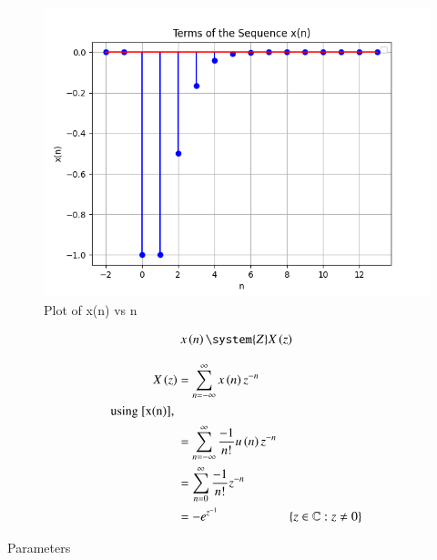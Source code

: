 \documentclass[journal,12pt,twocolumn]{IEEEtran}
\begin{document}
 \begin{figure}[h]
   \centering
   \includegraphics[width=1\columnwidth]{figs/plot.png}
   \caption{Plot of x(n) vs n}
   \label{fig: 9.1.12.1}
 \end{figure}

\begin{align}
	x \brak{n} \system{Z} X \brak{z} 
\end{align}

\begin{align}
    X \left(z\right) & = \sum_{n=-\infty}^{\infty} x \left(n\right)   z^{-n} \\
    \notag \text{using \eqref{x(n)}, } \\
    & = \sum_{n=-\infty}^{\infty} \frac{-1}{n!}  u \left(n\right)   z^{-n} \\
    & = \sum_{n=0}^{\infty} \frac{-1}{n!}   z^{-n} \\
    & = - e^{z^{-1}} &  \left\{z\in\mathbb{C} : z \neq 0\right\} 
\end{align}





\begin{table}[h]
    \centering
    
    \caption{Parameters}
    \label{tab: 9.1.12.1}
\end{table}
\end{document}
